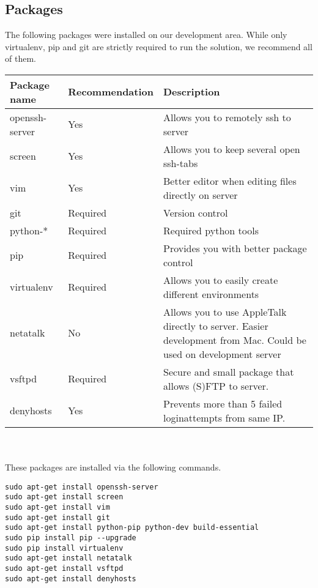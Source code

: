 \documentclass{report}
\begin{document}
\subsection{Packages}
The following packages were installed on our development area. While only virtualenv, pip and git are strictly required to run the solution, we recommend all of them.\\
\begin{tabular}{| l | l | p{9cm} |} \hline
Package name & Recommendation & Description \\ \hline
openssh-server\cite{website:openssh} & Yes & Allows you to remotely ssh to server \\ \hline
screen\cite{website:screen} & Yes & Allows you to keep several open ssh-tabs \\ \hline
vim\cite{website:vim} & Yes & Better editor when editing files directly on server\\ \hline
git\cite{website:git} & Required & Version control \\ \hline
python-*\cite{website:buildessentatial} & Required & Required python tools \\ \hline
pip\cite{website:pip} & Required & Provides you with better package control \\ \hline
virtualenv\cite{website:virtualenv} & Required & Allows you to easily create different environments\\ \hline
netatalk\cite{website:netatalk} & No & Allows you to use AppleTalk directly to server. Easier development from Mac. Could be used on development server \\ \hline
vsftpd\cite{website:vsftpd} & Required & Secure and small package that allows (S)FTP to server. \\ \hline
denyhosts\cite{website:denyhosts} & Yes & Prevents more than 5 failed loginattempts from same IP. \\ \hline
\end{tabular}\\ \\
These packages are installed via the following commands.

\begin{verbatim}
sudo apt-get install openssh-server
sudo apt-get install screen
sudo apt-get install vim
sudo apt-get install git
sudo apt-get install python-pip python-dev build-essential
sudo pip install pip --upgrade
sudo pip install virtualenv
sudo apt-get install netatalk 
sudo apt-get install vsftpd
sudo apt-get install denyhosts 
\end{verbatim}
\end{document}
